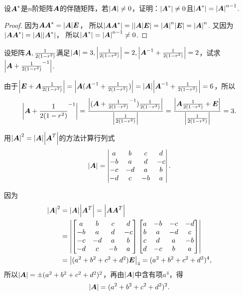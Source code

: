 \begin{example}
设\(\A^*\)是\(n\)阶矩阵\(\A\)的伴随矩阵，若\(\abs{\A} \neq 0\)，证明：\(\abs{\A^*} \neq 0\)且\(\abs{\A^*}=\abs{\A}^{n-1}\).
\begin{proof}
因为\(\A \A^* = \abs{\A} \E\)，
所以\(\abs{\A \A^*} = \abs{\abs{\A} \E} = \abs{\A}^n \abs{\E} = \abs{\A}^n\).
又因为\(\abs{\A \A^*} = \abs{\A} \abs{\A^*}\)，
所以\(\abs{\A^*} = \abs{\A}^{n-1} \neq 0\).
\end{proof}
\end{example}

\begin{example}
设矩阵\(\A,\B\)满足\(\abs{\A}=3,\abs{\B}=2,\abs{\A^{-1}+\B}=2\)，试求\(\abs{\A+\B^{-1}}\).
\begin{solution}
由于\(\abs{\E+\A\B} = \abs{\A(\A^{-1}+\B)} = \abs{\A} \abs{\A^{-1}+\B} = 6\)，所以\[
\abs{\A+\B^{-1}}
= \frac{\abs{(\A+\B^{-1})\B}}{\abs{\B}}
= \frac{\abs{\A\B+\E}}{\abs{\B}}
= 3.
\]
\end{solution}
\end{example}

\begin{example}
用\(\abs{\A}^2 = \abs{\A} \abs{\A^T}\)的方法计算行列式\[
\abs{\A} = \begin{vmatrix}
a & b & c & d \\
-b & a & d & -c \\
-c & -d & a & b \\
-d & c & -b & a
\end{vmatrix}.
\]
\begin{solution}
因为\begin{align*}
\abs{\A}^2 &= \abs{\A} \abs{\A^T} = \abs{\A \A^T} \\
&= \abs{\begin{bmatrix}
a & b & c & d \\
-b & a & d & -c \\
-c & -d & a & b \\
-d & c & -b & a
\end{bmatrix} \begin{bmatrix}
a & -b & -c & -d \\
b & a & -d & c \\
c & d & a & -b \\
d & -c & b & a
\end{bmatrix}} \\
&= \abs{(a^2+b^2+c^2+d^2) \E}_4
= (a^2+b^2+c^2+d^2)^4,
\end{align*}所以\(\abs{\A} = \pm(a^2+b^2+c^2+d^2)^2\)，再由\(\abs{\A}\)中含有项\(a^4\)，得\[
\abs{\A} = (a^2+b^2+c^2+d^2)^2.
\]
\end{solution}
\end{example}

